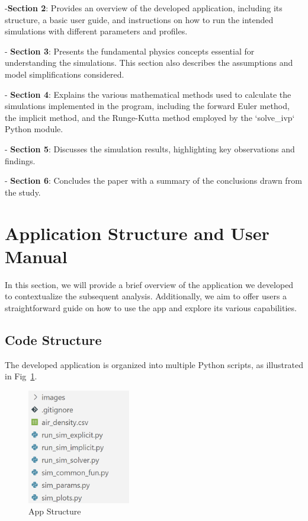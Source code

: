 \documentclass[runningheads]{llncs}
\begin{document}
-\textbf{Section 2}: Provides an overview of the developed application, including its structure, a basic user guide, and instructions on how to run the intended simulations with different parameters and profiles.

- \textbf{Section 3}: Presents the fundamental physics concepts essential for understanding the simulations. This section also describes the assumptions and model simplifications considered.

- \textbf{Section 4}: Explains the various mathematical methods used to calculate the simulations implemented in the program, including the forward Euler method, the implicit method, and the Runge-Kutta method employed by the `solve\_ivp` Python module.

- \textbf{Section 5}: Discusses the simulation results, highlighting key observations and findings.

- \textbf{Section 6}: Concludes the paper with a summary of the conclusions drawn from the study.




\section{Application Structure and User Manual}
In this section, we will provide a brief overview of the application we developed to contextualize the subsequent analysis. Additionally, we aim to offer users a straightforward guide on how to use the app and explore its various capabilities.

\subsection{Code Structure}
The developed application \cite{git} is organized into multiple Python scripts, as illustrated in Fig~\ref{app_structure}.

\begin{figure}
\centering
\includegraphics[width=0.4\textwidth]{images/app_structure.png}
\caption{App Structure \cite{git}} \label{app_structure}
\end{figure}
\end{document}
